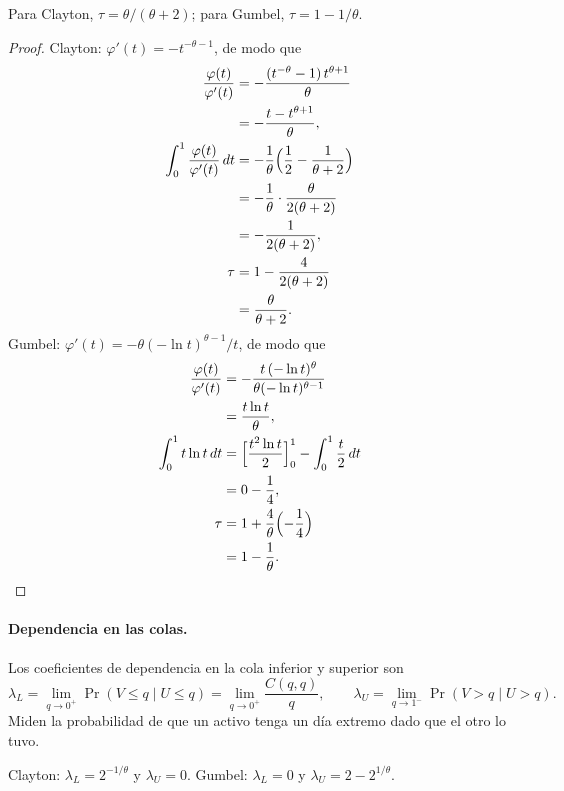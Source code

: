 \begin{proposicion}\label{prop:taukendall}
Para Clayton, $\tau=\theta/(\theta+2)$; para Gumbel, $\tau=1-1/\theta$.
\end{proposicion}

\begin{proof}
Clayton: $\varphi'(t)=-t^{-\theta-1}$, de modo que
\begin{align*}
  \frac{\varphi(t)}{\varphi'(t)} &= -\frac{(t^{-\theta}-1)\,t^{\theta+1}}{\theta}\\
                                 &= -\frac{t-t^{\theta+1}}{\theta},\\
  \int_0^1\frac{\varphi(t)}{\varphi'(t)}\,dt &= -\frac1\theta\Bigl(\frac12-\frac1{\theta+2}\Bigr)\\
                                             &= -\frac1\theta\cdot\frac{\theta}{2(\theta+2)}\\
                                             &= -\frac{1}{2(\theta+2)},\\
  \tau &= 1-\frac{4}{2(\theta+2)}\\
       &= \frac{\theta}{\theta+2}.
\end{align*}
Gumbel: $\varphi'(t)=-\theta(-\ln t)^{\theta-1}/t$, de modo que
\begin{align*}
  \frac{\varphi(t)}{\varphi'(t)} &= -\frac{t\,(-\ln t)^\theta}{\theta(-\ln t)^{\theta-1}}\\
                                 &= \frac{t\ln t}{\theta},\\
  \int_0^1t\ln t\,dt &= \Bigl[\frac{t^2\ln t}{2}\Bigr]_0^1-\int_0^1\frac t2\,dt\\
                     &= 0-\frac14,\\
  \tau &= 1+\frac4\theta\Bigl(-\frac14\Bigr)\\
       &= 1-\frac1\theta .
\end{align*}
\end{proof}

\paragraph{Dependencia en las colas.} Los coeficientes de dependencia en la cola inferior y superior son
\[
  \lambda_L=\lim_{q\to0^+}\Pr(V\le q\mid U\le q)=\lim_{q\to0^+}\frac{C(q,q)}{q},\qquad
  \lambda_U=\lim_{q\to1^-}\Pr(V>q\mid U>q).
\]
Miden la probabilidad de que un activo tenga un día extremo dado que el otro lo tuvo.

\begin{proposicion}\label{prop:colas}
Clayton: $\lambda_L=2^{-1/\theta}$ y $\lambda_U=0$. Gumbel: $\lambda_L=0$ y $\lambda_U=2-2^{1/\theta}$.
\end{proposicion}

